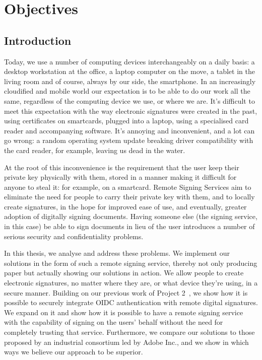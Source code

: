\chapter*{Objectives}
\label{ch:objectives}


\section{Introduction}
\label{sec:introduction}

Today, we use a number of computing devices interchangeably on a daily basis: a desktop workstation at the office,
a laptop computer on the move, a tablet in the living room and of course, always by our side, the smartphone.
In an increasingly cloudified and mobile world our expectation is to be able to do our work all the same,
regardless of the computing device we use, or where we are.
It's difficult to meet this expectation with the way electronic signatures were created in the past,
using certificates on smartcards, plugged into a laptop, using a specialised card reader and accompanying software.
It's annoying and inconvenient, and a lot can go wrong:
a random operating system update breaking driver compatibility with the card reader, for example,
leaving us dead in the water.


At the root of this inconvenience is the requirement that the user keep their private key physically with them,
stored in a manner making it difficult for anyone to steal it: for example, on a smartcard.
Remote Signing Services aim to eliminate the need for people to carry their private key with them,
and to locally create signatures,
in the hope for improved ease of use, and eventually, greater adoption of digitally signing documents.
Having someone else (the signing service, in this case) be able to sign documents in lieu of the user introduces a number of serious security and confidentiality problems.


In this thesis, we analyse and address these problems.
We implement our solutions in the form of such a remote signing service,
thereby not only producing paper but actually showing our solutions in action.
We allow people to create electronic signatures,
no matter where they are, or what device they're using,
in a secure manner.
Building on our previous work of Project 2~\cite{projekt2}, we show how it is possible to securely integrate \gls{OIDC} authentication with remote digital signatures.
We expand on it and show how it is possible to have a remote signing service with the capability of signing on the users' behalf without the need for completely trusting that service.
Furthermore, we compare our solutions to those proposed by an industrial consortium led by Adobe Inc.,
and we show in which ways we believe our approach to be superior.

